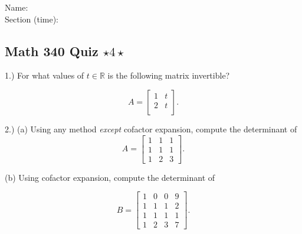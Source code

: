 \documentclass{article}
\begin{document}
Name:\\
\medskip
Section (time):

\subsection*{Math 340 Quiz $\star 4\star$}
1.) For what values of $t\in\mathbb{R}$ is the following matrix invertible?

$$A=\left[\begin{array}{cc}
1 & t\\
2 & t\\
\end{array}\right].$$


2.) (a) Using any method \emph{except} cofactor expansion, compute the determinant of 
$$A=\left[\begin{array}{ccc}
1 & 1 & 1\\
1 & 1 & 1\\
1 & 2 & 3 
\end{array}\right].$$

(b) Using cofactor expansion, compute the determinant of 

$$B=\left[\begin{array}{cccc}
1 & 0 & 0 & 9\\
1 & 1 & 1 & 2\\
1 & 1 & 1 & 1\\
1 & 2 & 3 & 7
\end{array}\right].$$
\medskip
\end{document}

